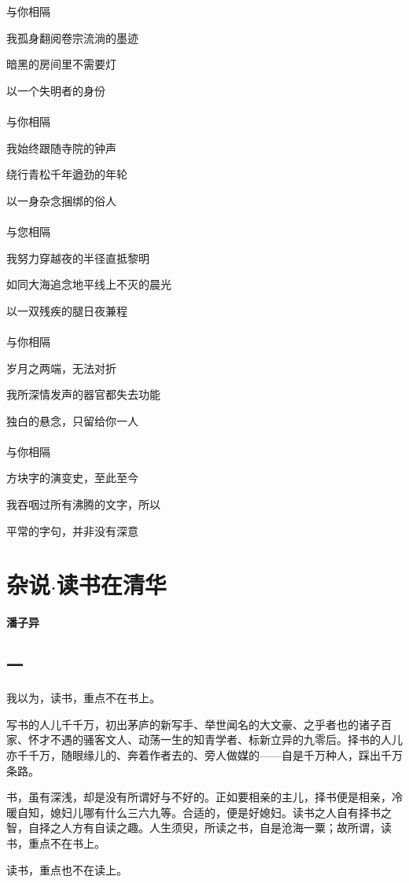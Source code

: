 \documentclass[openany,scheme = chinese, linespread = 1.5]{ctexbook}
\newcommand \name[1]{\begin{center} \kaishu \Large \bfseries #1 \end{center}}
\begin{document}
\begin{center}

与你相隔

我孤身翻阅卷宗流淌的墨迹

暗黑的房间里不需要灯

以一个失明者的身份\\
\ \\
与你相隔

我始终跟随寺院的钟声

绕行青松千年遒劲的年轮

以一身杂念捆绑的俗人\\
\ \\
与您相隔

我努力穿越夜的半径直抵黎明

如同大海追念地平线上不灭的晨光

以一双残疾的腿日夜兼程\\
\ \\
与你相隔

岁月之两端，无法对折

我所深情发声的器官都失去功能

独白的悬念，只留给你一人\\
\ \\
与你相隔

方块字的演变史，至此至今

我吞咽过所有沸腾的文字，所以

平常的字句，并非没有深意

\end{center}

\newpage
\section{杂说$\cdot$读书在清华}
\name{潘子异}
\subsection*{一}
我以为，读书，重点不在书上。

写书的人儿千千万，初出茅庐的新写手、举世闻名的大文豪、之乎者也的诸子百家、怀才不遇的骚客文人、动荡一生的知青学者、标新立异的九零后。择书的人儿亦千千万，随眼缘儿的、奔着作者去的、旁人做媒的——自是千万种人，踩出千万条路。

书，虽有深浅，却是没有所谓好与不好的。正如要相亲的主儿，择书便是相亲，冷暖自知，媳妇儿哪有什么三六九等。合适的，便是好媳妇。读书之人自有择书之智，自择之人方有自读之趣。人生须臾，所读之书，自是沧海一粟；故所谓，读书，重点不在书上。

读书，重点也不在读上。
\end{document}
